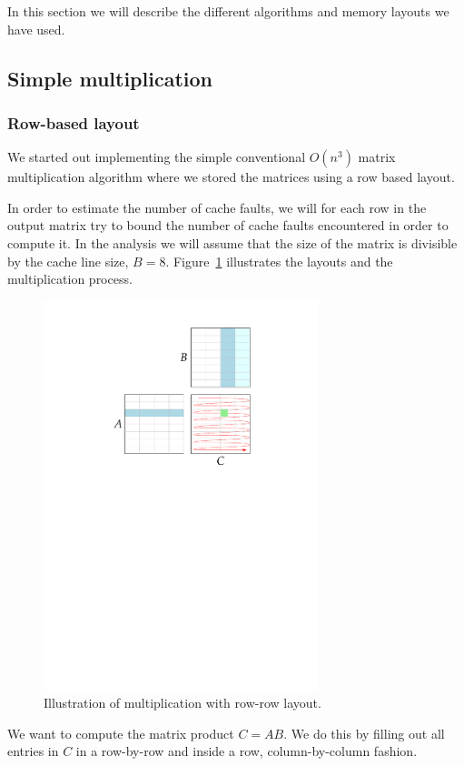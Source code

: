 In this section we will describe the different algorithms and memory
layouts we have used.

\subsection{Simple multiplication}

\subsubsection{Row-based layout}
We started out implementing the simple conventional $O(n^3)$ matrix
multiplication algorithm where we stored the matrices using a row
based layout.

In order to estimate the number of cache faults, we will for each row
in the output matrix try to bound the number of cache faults
encountered in order to compute it. In the analysis we will assume
that the size of the matrix is divisible by the cache line size, $B =
8$. Figure~\ref{fig:rowrowmul} illustrates the layouts and the
multiplication process.
\begin{figure}[h!]
  \centering
  \includegraphics[width=8cm]{images/rowrowmul}
  \caption{Illustration of multiplication with row-row layout.}
  \label{fig:rowrowmul}
\end{figure}

We want to compute the matrix product $C = AB$. We do this by filling
out all entries in $C$ in a row-by-row and inside a row,
column-by-column fashion. 

